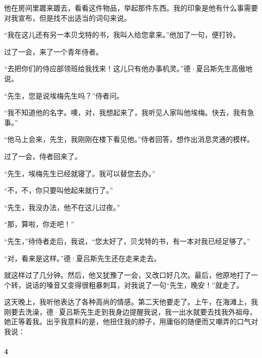\par 他在房间里踱来踱去，看看这件物品，举起那件东西。我的印象是他有什么事需要对我宣布，但是找不出适当的词句来说。
\par “我在这儿还有另一本贝戈特的书，我叫人给您拿来。”他加了一句，便打铃。
\par 过了一会，来了一个青年侍者。
\par “去把你们的侍应部领班给我找来！这儿只有他办事机灵。”德·夏吕斯先生高傲地说。
\par “先生，您是说埃梅先生吗？”侍者问。
\par “我不知道他的名字。噢，对，我想起来了，我听见人家叫他埃梅。快去，我有急事。”
\par “他马上会来，先生，我刚刚在楼下看见他。”侍者回答，想作出消息灵通的模样。
\par 过了一会，侍者回来了。
\par “先生，埃梅先生已经就寝了。我可以替您去办。”
\par “不，不，你只要叫他起来就行了。”
\par “先生，我没办法，他不在这儿过夜。”
\par “那，算啦，你走吧！”
\par “先生，”待侍者走后，我说，“您太好了，贝戈特的书，有一本对我已经足够了。”
\par “对，看来是这样。”德·夏吕斯先生还在走来走去。
\par 就这样过了几分钟。然后，他又犹豫了一会，又改口好几次。最后，他原地打了一个转，说话的嗓音又变得很粗暴刺耳，对我说了一句“先生，晚安！”就走了。
\par 这天晚上，我听他表达了各种高尚的情感。第二天他要走了。上午，在海滩上，我刚要去洗澡，德·夏吕斯先生走到我身边提醒我说，我一出水就要去找我外祖母，她正等着我。出乎我意料的是，他扭住我的脖子，用庸俗的随便而又嘲弄的口气对我说：

\paragraph*{4}

